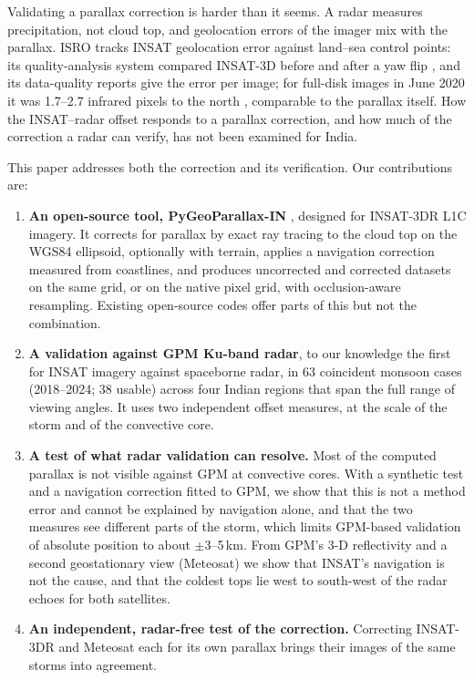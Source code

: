Validating a parallax correction is harder than it seems. A radar measures precipitation, not cloud top, and geolocation errors of the imager mix with the parallax. ISRO tracks INSAT geolocation error against land--sea control points: its quality-analysis system compared INSAT-3D before and after a yaw flip \citep{jindal2014}, and its data-quality reports give the error per image; for full-disk images in June 2020 it was 1.7--2.7 infrared pixels to the north \citep{mosdac_dqe2020}, comparable to the parallax itself. How the INSAT--radar offset responds to a parallax correction, and how much of the correction a radar can verify, has not been examined for India.

This paper addresses both the correction and its verification. Our contributions are:
\begin{enumerate}
  \item \textbf{An open-source tool, PyGeoParallax-IN} \citep{pygeoparallax}, designed for INSAT-3DR L1C imagery. It corrects for parallax by exact ray tracing to the cloud top on the WGS84 ellipsoid, optionally with terrain, applies a navigation correction measured from coastlines, and produces uncorrected and corrected datasets on the same grid, or on the native pixel grid, with occlusion-aware resampling. Existing open-source codes offer parts of this but not the combination.
  \item \textbf{A validation against GPM Ku-band radar}, to our knowledge the first for INSAT imagery against spaceborne radar, in 63 coincident monsoon cases (2018--2024; 38 usable) across four Indian regions that span the full range of viewing angles. It uses two independent offset measures, at the scale of the storm and of the convective core.
  \item \textbf{A test of what radar validation can resolve.} Most of the computed parallax is not visible against GPM at convective cores. With a synthetic test and a navigation correction fitted to GPM, we show that this is not a method error and cannot be explained by navigation alone, and that the two measures see different parts of the storm, which limits GPM-based validation of absolute position to about $\pm$3--5\,km. From GPM's 3-D reflectivity and a second geostationary view (Meteosat) we show that INSAT's navigation is not the cause, and that the coldest tops lie west to south-west of the radar echoes for both satellites.
  \item \textbf{An independent, radar-free test of the correction.} Correcting INSAT-3DR and Meteosat each for its own parallax brings their images of the same storms into agreement.

\end{enumerate}
